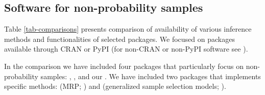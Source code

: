 \documentclass[
]{jss}
\begin{document}
\subsection{Software for non-probability samples}\label{sec-software}

Table \ref{tab-comparisons} presents comparison of availability of
various inference methods and functionalities of selected packages. We
focused on packages available through CRAN or PyPI (for non-CRAN or
non-PyPI software see \citet{cobo2024software}).

In the comparison we have included four packages that particularly focus
on non-probability samples:  \citep{NonProbEst},
 \citep{sarig2023balancepythonpackage}, 
\citep{castro2024inps} and our . We have included two
packages that implements specific methods:  (MRP;
\citet{rstanarm}) and  (generalized sample selection models;
\citet{GJRM}).

\begin{table}[ht!]
\centering
{}
\caption{Comparison of packages and implemented methods}
\label{tab-comparisons}
\end{table}
\end{document}
